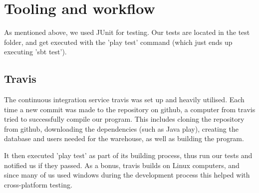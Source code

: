\section{Tooling and workflow}

As mentioned above, we used JUnit for testing. Our tests are located in the test folder, and get executed with
the 'play test' command  (which just ends up executing 'sbt test').

\subsection{Travis}
The continuous integration service travis was set up and heavily utilised. 
Each time a new commit was made to the repository on github, a computer from travis 
tried to successfully compile our program. This includes cloning the repository from github,
downloading the dependencies (such as Java play),
creating the database and users needed for the warehouse, as well as building the program.

It then executed 'play test' as part of its building process, thus run our tests and notified us if they passed. As a bonus, travis builds on Linux computers, and since many of us used windows during the development process this helped with cross-platform testing.
